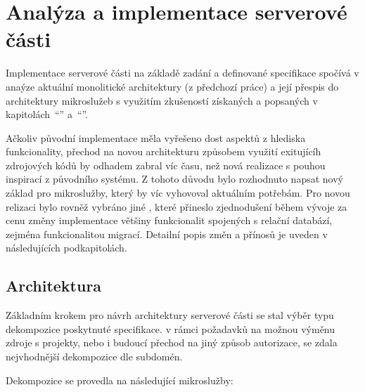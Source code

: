 \chapter{Analýza a implementace serverové části}\label{ch:server}


Implementace serverové části na základě zadání a definované specifikace  spočívá v anaýze aktuální monolitické architektury (z předchozí práce) a její přespis do architektury mikroslužeb s využitím zkušeností získaných a popsaných v kapitolách~\enquote{} a~\enquote{}.

Ačkoliv původní implementace měla vyřešeno dost aspektů z hlediska funkcionality, přechod na novou architekturu způsobem využití exitujícíh zdrojových kódů by odhadem zabral víc času, než nová realizace s pouhou inspirací z původního systému.
Z tohoto důvodu bylo rozhodnuto napsat nový základ pro mikroslužby, který by víc vyhovoval aktuálním potřebám.
Pro novou relizaci bylo rovněž vybráno jiné , které přineslo zjednodušení během vývoje za cenu změny implementace většiny funkcionalit spojených s relační databází, zejména funkcionalitou migrací.
Detailní popis změn a přínosů je uveden v následujících podkapitolách.

\newpage



\section{Architektura}\label{sec:server-arch}

Základním krokem pro návrh architektury serverové části se stal výběr typu dekompozice poskytnuté specifikace.
v rámci požadavků na možnou výměnu zdroje s projekty, nebo i budoucí přechod na jiný způsob autorizace, se zdala nejvhodnější dekompozice dle subdomén.

Dekompozice se provedla na následující mikroslužby:

